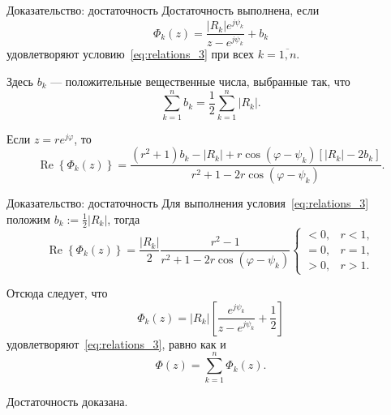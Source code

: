 \documentclass[notheorems,aspectratio=169]{beamer}
\theoremstyle{definition}
\newcommand{\abs}[1]{\left| #1 \right|}
\renewcommand{\Re}{\operatorname{Re}}
\begin{document}
\begin{frame}{Доказательство: достаточность}
  Достаточность выполнена, если
  \begin{equation}
    \Phi_k(z) = \frac{\abs{R_k} e^{j\psi_k}}{z - e^{j\psi_k}} + b_k
  \end{equation}
  удовлетворяют условию~\eqref{eq:relations_3} при всех $k=\overline{1,n}$.

  Здесь $b_k$ --- положительные вещественные числа, выбранные так, что
  \begin{equation*}
    \sum_{k=1}^n b_k = \frac{1}{2}\sum_{k=1}^n \abs{R_k}.
  \end{equation*}

  Если $z = re^{j\varphi}$, то
  \begin{equation*}
    \Re \left\{ \Phi_k(z) \right\} = \frac
        {(r^2 + 1)b_k - \abs{R_k} + r \cos(\varphi - \psi_k) \left[ \abs{R_k} -2 b_k \right]}
        {r^2 + 1 - 2r \cos(\varphi - \psi_k)}.
  \end{equation*}
\end{frame}

\begin{frame}{Доказательство: достаточность}
  Для выполнения условия~\eqref{eq:relations_3} положим $b_k := \frac{1}{2}\abs{R_k}$, тогда
  \begin{equation*}
    \Re \left\{ \Phi_k(z) \right\} = \frac{\abs{R_k}}{2} \frac{r^2 - 1}{r^2 + 1 - 2r \cos(\varphi - \psi_k)}
    \begin{cases}
      < 0, & r < 1, \\
      = 0, & r = 1, \\
      > 0, & r > 1.
    \end{cases}
  \end{equation*}

  Отсюда следует, что 
  \begin{equation*}
    \Phi_k(z) = \abs{R_k} \left[ \frac{e^{j\psi_k}}{z - e^{j\psi_k}} + \frac{1}{2} \right]
  \end{equation*}
  удовлетворяют~\eqref{eq:relations_3}, равно как и
  \begin{equation*}
    \Phi(z) = \sum_{k=1}^n \Phi_k(z).
  \end{equation*}

  Достаточность доказана.
\end{frame}
\end{document}
